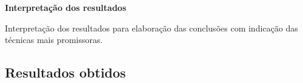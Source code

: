             \textbf{Interpretação dos resultados}\par
            Interpretação dos resultados para elaboração das conclusões com indicação das técnicas mais promissoras.\newline

        \subsection{Resultados obtidos}

